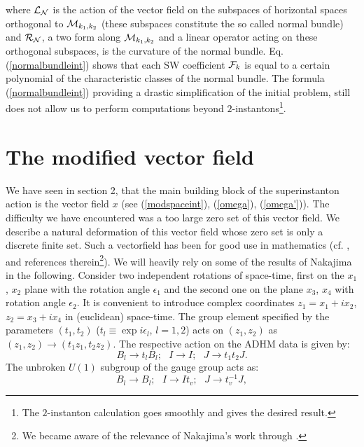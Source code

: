 \documentclass[a4paper,12pt]{article}
\begin{document}
where ${\cal L}_{\cal N}$ is the action of the vector field on the
subspaces of horizontal spaces orthogonal to ${\cal M}_{k_1 ,
k_2}$ (these subspaces constitute the so called normal bundle) and
${\cal R}_{\cal N}$, a two form along ${\cal M}_{k_1 , k_2}$ and a
linear operator acting on these orthogonal subspaces, is the
curvature of the normal bundle. Eq. (\ref{normalbundleint}) shows
that each SW coefficient ${\cal F}_k$ is equal to a certain
polynomial of the characteristic classes of the normal bundle. The
formula (\ref{normalbundleint}) providing a drastic simplification
of the initial problem, still does not allow us to perform
computations beyond $2$-instantons\footnote{The $2$-instanton
calculation goes smoothly and gives the desired result.}.

\setcounter{equation}{0}
\section{The modified vector field }
\renewcommand{\theequation}{3.\arabic{equation}}
We have seen in section 2, that the main building block of the
superinstanton action is the vector field $x$ (see
(\ref{modspaceint}), (\ref{omega}), (\ref{omega'})). The
difficulty we have encountered was a too large zero set of this
vector field. We describe a natural deformation of this vector
field whose zero set is only a discrete finite set. Such a
vectorfield has been for good use in mathematics (cf. \cite{Nak},
and references therein\footnote{We became aware of the relevance
of Nakajima's work through \cite{N}.}). We will heavily rely on
some of the results of Nakajima in the following. Consider two
independent rotations of space-time, first  on the $x_1$, $x_2$
plane with the rotation angle $\epsilon_1$ and the second one on
the plane $x_3$, $x_4$ with rotation angle $\epsilon_2$. It is
convenient to introduce complex coordinates $z_1=x_1+ix_2$,
$z_2=x_3+ix_4$ in (euclidean) space-time. The group element
specified by the parameters $(t_1,t_2)$ ($t_l\equiv \exp
i\epsilon_l$, $l=1,2$) acts on $(z_1,z_2)$ as
$(z_1,z_2)\rightarrow (t_1 z_1, t_2 z_2)$. The respective action
on the ADHM data is given by:
\begin{equation}
B_l\rightarrow t_l B_l ; \, \, \, \, I\rightarrow I; \, \, \, \, J\rightarrow t_1 t_2 J.
\label{torusaction}
\end{equation}
The unbroken $U(1)$ subgroup of the gauge group acts as:
\begin{equation}
B_l\rightarrow B_l ; \, \, \, \, I\rightarrow It_v; \, \, \, \, J\rightarrow t_v^{-1} J,
\label{u1action}
\end{equation}
\end{document}
